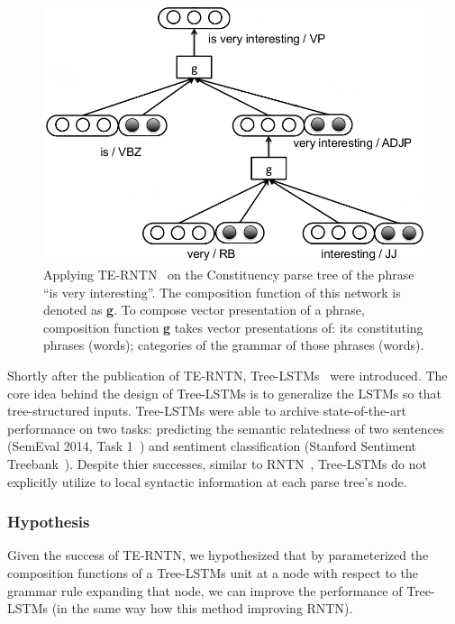 \begin{figure}[H]
    \centering
    \includegraphics[scale=0.4]{figure/example-compose-tag}
    \caption[Applying TE-RNTN on the phrase ``is very interesting'']{Applying TE-RNTN~\cite{tag-embedding-rnn} on the Constituency parse tree of the phrase ``is very interesting''.
    The composition function of this network is denoted as \textbf{g}.
    To compose vector presentation of a phrase, composition function \textbf{g} takes vector presentations of: its constituting phrases (words); categories of the grammar of those phrases (words).}
    \label{fig:example-compose-tag}
\end{figure}

Shortly after the publication of TE-RNTN, Tree-LSTMs~\cite{treeLSTM} were introduced.
The core idea behind the design of Tree-LSTMs is to generalize the LSTMs so that tree-structured inputs.
Tree-LSTMs were able to archive state-of-the-art performance on two tasks: predicting the semantic relatedness of two sentences (SemEval 2014, Task 1~\cite{SemeEvalTask1}) and sentiment classification (Stanford Sentiment Treebank~\cite{socher2013recursive}).
Despite thier successes, similar to RNTN~\cite{socher2013recursive}, Tree-LSTMs do not explicitly utilize to local syntactic information at each parse tree's node.

\subsubsection{Hypothesis}
Given the success of TE-RNTN, we hypothesized that by parameterized the composition functions of a Tree-LSTMs unit at a node with respect to the grammar rule expanding that node, we can improve the performance of Tree-LSTMs (in the same way how this method improving RNTN).

